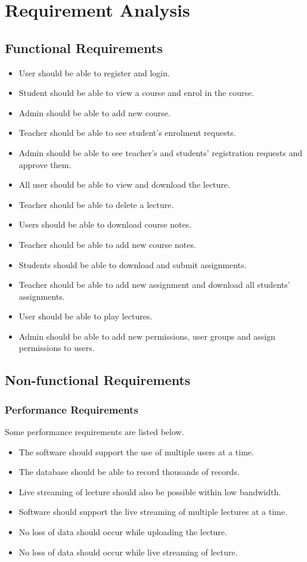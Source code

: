 \documentclass[12pt]{article}
\begin{document}
\section{Requirement Analysis}
\subsection{Functional Requirements}
\begin{itemize}
\item User should be able to register and login.
\item Student should be able to view a course and enrol in the course.
\item Admin should be able to add new course.
\item Teacher should be able to see student's enrolment requests.
\item Admin should be able to see teacher's and students' registration requests and approve them.
\item All user should be able to view and download the lecture.
\item Teacher should be able to delete a lecture.
\item Users should be able to download course notes.
\item Teacher should be able to add new course notes.
\item Students should be able to download and submit assignments.
\item Teacher should be able to add new assignment and download all students' assignments.
\item User should be able to play lectures.
\item Admin should be able to add new permissions, user groups and assign permissions to users.

\end{itemize}

\subsection{Non-functional Requirements}
\subsubsection{Performance Requirements}
Some performance requirements are listed below.
\begin{itemize}
\item The software should support the use of multiple users at a time.
\item The database should be able to record thousands of records.
\item Live streaming of lecture should also be possible within low bandwidth.
\item Software should support the live streaming of multiple lectures at a time.
\item No loss of data should occur while uploading the lecture.
\item No loss of data should occur while live streaming of lecture.
\end{itemize}
%
%
\end{document}
